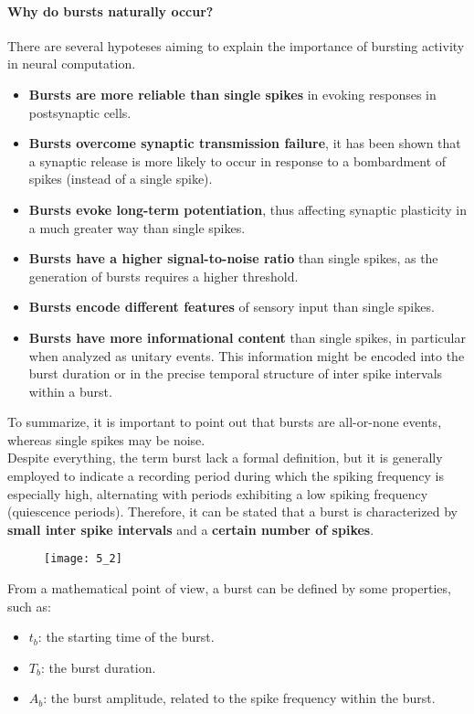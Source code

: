 \paragraph{Why do bursts naturally occur?}
There are several hypoteses aiming to explain the importance of bursting activity in
neural computation.
\begin{itemize}
    \item \textbf{Bursts are more reliable than single spikes} in evoking responses in
    postsynaptic cells.
    \item \textbf{Bursts overcome synaptic transmission failure}, it has been shown
    that a synaptic release is more likely to occur in response to a bombardment
    of spikes (instead of a single spike).
    \item \textbf{Bursts evoke long-term potentiation}, thus affecting synaptic
    plasticity in a much greater way than single spikes.
    \item \textbf{Bursts have a higher signal-to-noise ratio} than single spikes, as
    the generation of bursts requires a higher threshold.
    \item \textbf{Bursts encode different features} of sensory input than single
    spikes.
    \item \textbf{Bursts have more informational content} than single spikes, in
    particular when analyzed as unitary events. This information might be encoded
    into the burst duration or in the precise temporal structure of inter spike
    intervals within a burst. 
\end{itemize}
To summarize, it is important to point out that bursts are all-or-none events,
whereas single spikes may be noise.\\
Despite everything, the term burst lack a formal definition, but it is generally employed
to indicate a recording period during which the spiking frequency is especially high,
alternating with periods exhibiting a low spiking frequency (quiescence periods). Therefore,
it can be stated that a burst is characterized by \textbf{small inter spike intervals} and a
\textbf{certain number of spikes}.
\begin{figure}[H]
    \texttt{[image: 5\_2]}
    \centering
\end{figure}
From a mathematical point of view, a burst can be defined by some properties, such as:
\begin{itemize}
    \item \(t_b\): the starting time of the burst.
    \item \(T_b\): the burst duration.
    \item \(A_b\): the burst amplitude, related to the spike frequency within the burst.
\end{itemize}

